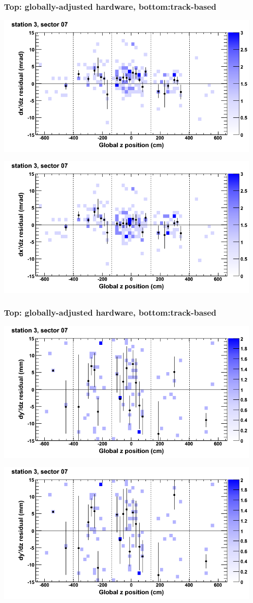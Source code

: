 \documentclass[compress]{beamer}
\begin{document}
\begin{frame}
\frametitle{Top: globally-adjusted hardware, bottom:track-based}
\includegraphics[width=0.7\linewidth]{NOV4_mapplots_HW/DTvsz_st3sec07_dxdz.png}

\includegraphics[width=0.7\linewidth]{NOV4_mapplots/DTvsz_st3sec07_dxdz.png}
\end{frame}

\begin{frame}
\frametitle{Top: globally-adjusted hardware, bottom:track-based}
\includegraphics[width=0.7\linewidth]{NOV4_mapplots_HW/DTvsz_st3sec07_dydz.png}

\includegraphics[width=0.7\linewidth]{NOV4_mapplots/DTvsz_st3sec07_dydz.png}
\end{frame}
\end{document}
